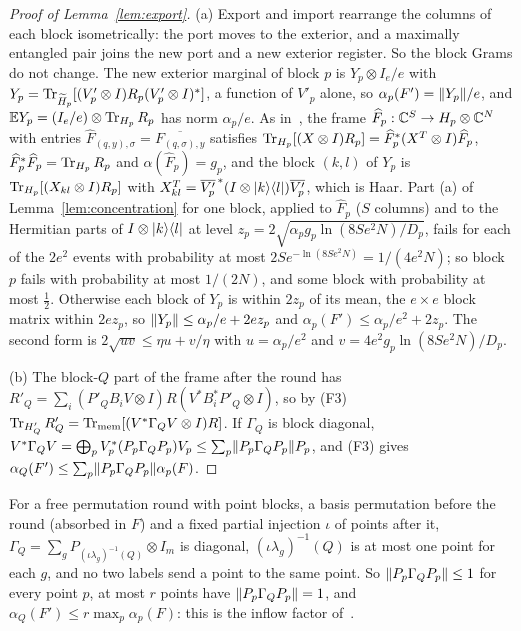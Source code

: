 \begin{proof}[Proof of Lemma~\ref{lem:export}]
(a) Export and import rearrange the columns of each block isometrically: the port moves to the exterior, and a maximally entangled pair joins the new port
and a new exterior register. So the block Grams do not change. The new exterior marginal of block $p$ is $Y_p\otimes I_e/e$ with
$Y_p=\operatorname{Tr}_{\widetilde H_p}[(V'_p\otimes I)R_p(V'_p\otimes I)^*]$, a function of $V'_p$ alone, so $\alpha_p(F')=\lVert Y_p\rVert/e$, and $\mathbb E Y_p=(I_e/e)\otimes\operatorname{Tr}_{H_p}R_p$ has
norm $\alpha_p/e$. As in~\cite[Lemma~A.4]{DouglasMghirbiB}, the frame $\widehat F_p:\mathbb C^S\to H_p\otimes\mathbb C^N$ with entries
$\widehat F_{(q,y),\sigma}=\overline{F_{(q,\sigma),y}}$ satisfies $\operatorname{Tr}_{H_p}[(X\otimes I)R_p]=\widehat F_p^*(X^T\otimes I)\widehat F_p$, $\widehat F_p^*\widehat F_p=\operatorname{Tr}_{H_p}R_p$ and
$\alpha(\widehat F_p)=g_p$, and the block $(k,l)$ of $Y_p$ is $\operatorname{Tr}_{H_p}[(X_{kl}\otimes I)R_p]$ with $X_{kl}^T=\overline{V'_p}^{\,*}(I\otimes\lvert k\rangle\langle l\rvert)\overline{V'_p}$, which is
Haar. Part (a) of Lemma~\ref{lem:concentration} for one block, applied to $\widehat F_p$ ($S$ columns) and to the Hermitian parts of $I\otimes\lvert k\rangle\langle l\rvert$ at level
$z_p=2\sqrt{\alpha_pg_p\ln(8Se^2N)/D_p}$, fails for each of the $2e^2$ events with probability at most $2Se^{-\ln(8Se^2N)}=1/(4e^2N)$; so block $p$ fails with
probability at most $1/(2N)$, and some block with probability at most $\frac12$. Otherwise each block of $Y_p$ is within $2z_p$ of its mean, the $e\times e$ block
matrix within $2ez_p$, so $\lVert Y_p\rVert\le\alpha_p/e+2ez_p$ and $\alpha_p(F')\le\alpha_p/e^2+2z_p$. The second form is $2\sqrt{uv}\le\eta u+v/\eta$ with
$u=\alpha_p/e^2$ and $v=4e^2g_p\ln(8Se^2N)/D_p$.

(b) The block-$Q$ part of the frame after the round has $R'_Q=\sum_i(P'_QB_iV\otimes I)R(V^*B_i^*P'_Q\otimes I)$, so by (F3)
$\operatorname{Tr}_{H'_Q}R'_Q=\operatorname{Tr}_{\rm mem}[(V^*\Gamma_QV\otimes I)R]$. If $\Gamma_Q$ is block diagonal, $V^*\Gamma_QV=\bigoplus_pV_p^*(P_p\Gamma_QP_p)V_p\le\sum_p\lVert P_p\Gamma_QP_p\rVert P_p$,
and (F3) gives $\alpha_Q(F')\le\sum_p\lVert P_p\Gamma_QP_p\rVert\alpha_p(F)$.
\end{proof}

For a free permutation round with point blocks, a basis permutation before the round (absorbed in $F$) and a fixed partial injection $\iota$ of points after
it, $\Gamma_Q=\sum_gP_{(\iota\lambda_g)^{-1}(Q)}\otimes I_m$ is diagonal, $(\iota\lambda_g)^{-1}(Q)$ is at most one point for each $g$, and no two labels send a point
to the same point. So $\lVert P_p\Gamma_QP_p\rVert\le1$ for every point $p$, at most $r$ points have $\lVert P_p\Gamma_QP_p\rVert=1$, and $\alpha_Q(F')\le r\max_p\alpha_p(F)$: this is
the inflow factor of~\cite[Theorem~12.2]{DouglasMghirbiC}.

